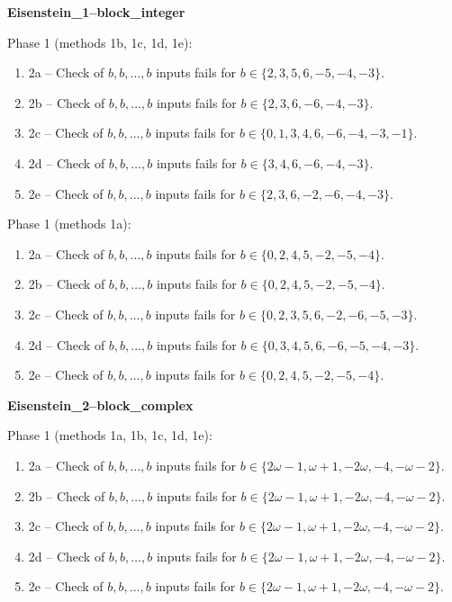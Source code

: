\begin{exmp}
\label{ex:compareAB}

\textbf{Eisenstein\_1--block\_integer}

Phase 1 (methods 1b, 1c, 1d, 1e):
\begin{enumerate}[ ]
\item  2a -- Check of $b,b,\dots,b$ inputs fails for $b\in \{2, 3, 5, 6, -5, -4, -3\}$.
\item  2b -- Check of $b,b,\dots,b$ inputs fails for $b\in \{2, 3, 6, -6, -4, -3\}$.
\item  2c -- Check of $b,b,\dots,b$ inputs fails for $b\in \{0, 1, 3, 4, 6, -6, -4, -3, -1\}$.
\item  2d -- Check of $b,b,\dots,b$ inputs fails for $b\in \{3, 4, 6, -6, -4, -3\}$.
\item  2e -- Check of $b,b,\dots,b$ inputs fails for $b\in \{2, 3, 6, -2, -6, -4, -3\}$.
\end{enumerate}


Phase 1 (methods 1a):
\begin{enumerate}[ ]
\item  2a -- Check of $b,b,\dots,b$ inputs fails for $b\in \{0, 2, 4, 5, -2, -5, -4\}$.
\item  2b -- Check of $b,b,\dots,b$ inputs fails for $b\in \{0, 2, 4, 5, -2, -5, -4\}$.
\item  2c -- Check of $b,b,\dots,b$ inputs fails for $b\in \{0, 2, 3, 5, 6, -2, -6, -5, -3\}$.
\item  2d -- Check of $b,b,\dots,b$ inputs fails for $b\in \{0, 3, 4, 5, 6, -6, -5, -4, -3\}$.
\item  2e -- Check of $b,b,\dots,b$ inputs fails for $b\in \{0, 2, 4, 5, -2, -5, -4\}$.
\end{enumerate}


\end{exmp}




\begin{exmp}
\label{ex:compareAC}

\textbf{Eisenstein\_2--block\_complex}

Phase 1 (methods 1a, 1b, 1c, 1d, 1e):
\begin{enumerate}[ ]
\item  2a -- Check of $b,b,\dots,b$ inputs fails for $b\in \{2\omega - 1, \omega + 1, -2\omega, -4, -\omega - 2\}$.
\item  2b -- Check of $b,b,\dots,b$ inputs fails for $b\in \{2\omega - 1, \omega + 1, -2\omega, -4, -\omega - 2\}$.
\item  2c -- Check of $b,b,\dots,b$ inputs fails for $b\in \{2\omega - 1, \omega + 1, -2\omega, -4, -\omega - 2\}$.
\item  2d -- Check of $b,b,\dots,b$ inputs fails for $b\in \{2\omega - 1, \omega + 1, -2\omega, -4, -\omega - 2\}$.
\item  2e -- Check of $b,b,\dots,b$ inputs fails for $b\in \{2\omega - 1, \omega + 1, -2\omega, -4, -\omega - 2\}$.
\end{enumerate}


\end{exmp}




